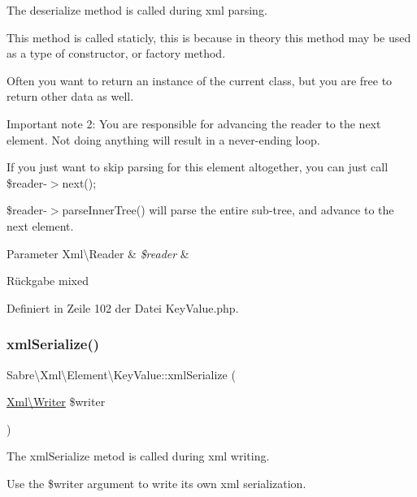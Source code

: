 The deserialize method is called during xml parsing.

This method is called staticly, this is because in theory this method may be used as a type of constructor, or factory method.

Often you want to return an instance of the current class, but you are free to return other data as well.

Important note 2\+: You are responsible for advancing the reader to the next element. Not doing anything will result in a never-\/ending loop.

If you just want to skip parsing for this element altogether, you can just call \$reader-\/$>$next();

\$reader-\/$>$parse\+Inner\+Tree() will parse the entire sub-\/tree, and advance to the next element.


\begin{DoxyParams}[1]{Parameter}
Xml\textbackslash{}\+Reader & {\em \$reader} & \\
\hline
\end{DoxyParams}
\begin{DoxyReturn}{Rückgabe}
mixed 
\end{DoxyReturn}


Definiert in Zeile 102 der Datei Key\+Value.\+php.

\mbox{\label{class_sabre_1_1_xml_1_1_element_1_1_key_value_acf981021984192a42aa9acb3e36b3a07}} 
\subsubsection{\texorpdfstring{xml\+Serialize()}{xmlSerialize()}}
{\footnotesize\ttfamily Sabre\textbackslash{}\+Xml\textbackslash{}\+Element\textbackslash{}\+Key\+Value\+::xml\+Serialize (\begin{DoxyParamCaption}\item[{\mbox{\hyperlink{class_sabre_1_1_xml_1_1_writer}{Xml\textbackslash{}\+Writer}}}]{\$writer }\end{DoxyParamCaption})}

The xml\+Serialize metod is called during xml writing.

Use the \$writer argument to write its own xml serialization.

